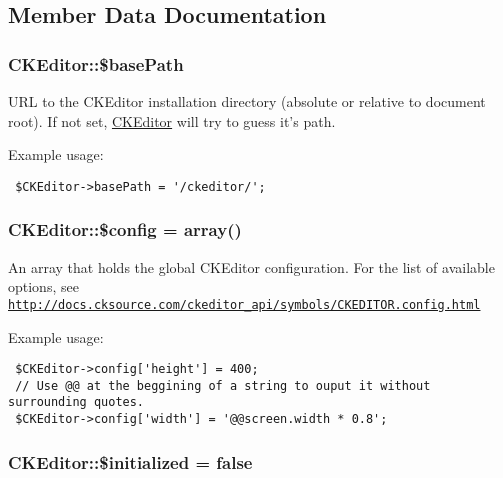  

\subsection{Member Data Documentation}
\hypertarget{classCKEditor_5a276aca7f1883ad38e53e1510846c19}{
\subsubsection[{\$basePath}]{\setlength{\rightskip}{0pt plus 5cm}CKEditor::\$basePath}}
\label{classCKEditor_5a276aca7f1883ad38e53e1510846c19}


URL to the CKEditor installation directory (absolute or relative to document root). If not set, \hyperlink{classCKEditor}{CKEditor} will try to guess it's path.

Example usage: 

\begin{Code}\begin{verbatim} $CKEditor->basePath = '/ckeditor/';
\end{verbatim}
\end{Code}

 \hypertarget{classCKEditor_54173f65f448c2f1afaade3b6cbe0cb9}{
\subsubsection[{\$config}]{\setlength{\rightskip}{0pt plus 5cm}CKEditor::\$config = array()}}
\label{classCKEditor_54173f65f448c2f1afaade3b6cbe0cb9}


An array that holds the global CKEditor configuration. For the list of available options, see \href{http://docs.cksource.com/ckeditor_api/symbols/CKEDITOR.config.html}{\tt http://docs.cksource.com/ckeditor\_\-api/symbols/CKEDITOR.config.html}

Example usage: 

\begin{Code}\begin{verbatim} $CKEditor->config['height'] = 400;
 // Use @@ at the beggining of a string to ouput it without surrounding quotes.
 $CKEditor->config['width'] = '@@screen.width * 0.8';
\end{verbatim}
\end{Code}

 \hypertarget{classCKEditor_bc1853e9e41b16bc32e7d201b9b8f560}{
\subsubsection[{\$initialized}]{\setlength{\rightskip}{0pt plus 5cm}CKEditor::\$initialized = false}}
\label{classCKEditor_bc1853e9e41b16bc32e7d201b9b8f560}


